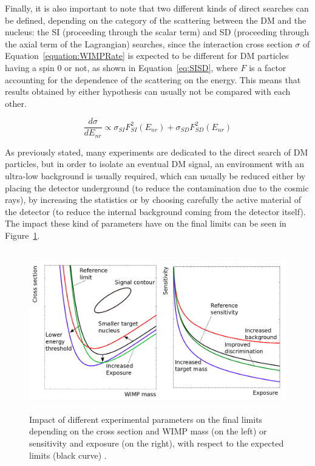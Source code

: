 \documentclass[a4paper, 10pt, openright]{report}
\begin{document}
Finally, it is also important to note that two different kinds of direct searches can be defined, depending on the category of the scattering between the \ac{DM} and the nucleus: the \acf{SI} (proceeding through the scalar term) and \acf{SD} (proceeding through the axial term of the Lagrangian) searches, since the interaction cross section $\sigma$ of Equation~\ref{equation:WIMPRate} is expected to be different for \ac{DM} particles having a spin 0 or not, as shown in Equation~\ref{eq:SISD}, where $F$ is a factor accounting for the dependence of the scattering on the energy. This means that results obtained by either hypothesis can usually not be compared with each other.

\begin{equation}
\label{eq:SISD}
\frac{d\sigma}{dE_{nr}} \propto \sigma_{SI} F_{SI}^2(E_{nr}) + \sigma_{SD} F_{SD}^2(E_{nr})
\end{equation}

As previously stated, many experiments are dedicated to the direct search of \ac{DM} particles, but in order to isolate an eventual \ac{DM} signal, an environment with an ultra-low background is usually required, which can usually be reduced either by placing the detector underground (to reduce the contamination due to the cosmic rays), by increasing the statistics or by choosing carefully the active material of the detector (to reduce the internal background coming from the detector itself). The impact these kind of parameters have on the final limits can be seen in Figure~\ref{fig:ImpactLimit}.

\begin{figure}[htbp]
\begin{center}
\includegraphics[width=14cm, height=7cm]{figs/ImpactLimits.png}
\caption{Impact of different experimental parameters on the final limits depending on the cross section and \ac{WIMP} mass (on the left) or sensitivity and exposure (on the right), with respect to the expected limits (black curve) \cite{DirectWays}.}
\label{fig:ImpactLimit}
\end{center}
\end{figure}
\end{document}
